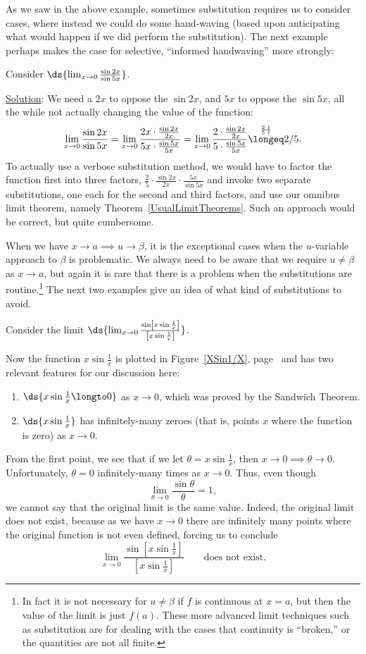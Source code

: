 As we saw in the above example, sometimes substitution requires
us to consider cases, where instead we could
do some hand-waving (based upon anticipating what would happen
if we did perform the substitution).  The next example perhaps makes
the case for selective, ``informed handwaving'' more strongly:

\bex Consider $\ds{\lim_{x\to0}\frac{\sin2x}{\sin5x}}$.

\underline{Solution}: We need a $2x$ to oppose the $\sin2x$,
and $5x$ to oppose the $\sin5x$, all the while not actually 
changing the value of the function:
$$
\lim_{x\to0}\frac{\sin2x}{\sin5x}
  =\lim_{x\to0}\frac{2x\cdot\frac{\sin2x}{2x}}{5x\cdot\frac{\sin5x}{5x}}
  =\lim_{x\to0}\frac{2\cdot\frac{\sin2x}{2x}}{5\cdot\frac{\sin5x}{5x}}
\overset{\frac{2\cdot1}{5\cdot1}}{\longeq}2/5.$$
\eex
To actually use a verbose substitution method, we would have to 
factor the function first into three factors,
$\frac{2}5\cdot\frac{\sin2x}{2x}\cdot\frac{5x}{\sin5x}$ and
invoke two separate substitutions, one each for the second and
third factors, and use our omnibus limit
theorem, namely Theorem~\ref{UsualLimitTheorems}.  Such an approach 
would be correct, but quite cumbersome. 



When we have $x\to a\implies u\to\beta$, it is the exceptional
cases when the $u$-variable approach to $\beta$ is
problematic.  We always need to be aware that we require $u\ne\beta$
as $x\to a$, but again it is rare that there is a problem
when the substitutions are routine.\footnote{%
In fact it is not
necessary for $u\ne\beta$ if $f$ is continuous at $x=a$,
but then the value of the limit is just $f(a)$.  These more
advanced limit techniques such as substitution are for 
dealing with the cases that continuity is ``broken,'' or the
quantities are not all finite.}
  The next two examples
give an idea of what kind of substitutions to avoid.

\bex Consider the limit $\ds{\lim_{x\to0}\frac{\sin\left[x\sin\frac1x\right]}
{\left[x\sin\frac1x\right]}}$.

Now the function $x\sin\frac1x$ is plotted in Figure~\ref{XSin1/X},
page~\pageref{XSin1/X}
and has two relevant features for our discussion here:
\begin{enumerate}
\item $\ds{x\sin\frac1x\longto0}$ as $x\to 0$, which was proved by
      the Sandwich Theorem.
\item $\ds{x\sin\frac1x}$ has infinitely-many zeroes (that is, 
      points $x$ where the function is zero) as $x\to 0$.
\end{enumerate}
From the first point, we see that if we let $\theta=x\sin\frac1x$,
then $x\to0\implies\theta\to0$.  Unfortunately, $\theta=0$
infinitely-many times as $x\to0$.  Thus, even though
$$\lim_{\theta\to0}\frac{\sin\theta}{\theta}=1,$$
we cannot say that the original limit is the same value.
Indeed, the original limit does not exist, because as we have $x\to0$
there are infinitely many points where the original function
is not even defined, forcing us to conclude
$$\lim_{x\to0}\frac{\sin\left[x\sin\frac1x\right]}
{\left[x\sin\frac1x\right]}\qquad\text{does not exist}.$$
\eex

